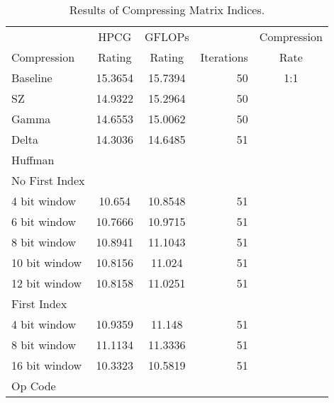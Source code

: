 \begin{table}
	\centering
	\begin{tabular}{l|S[table-format=2.6]|S[table-format=2.6]|r|c}
		            & {HPCG}   & {GFLOPs} &            & Compression \\
		Compression & {Rating} & {Rating} & Iterations & Rate \\
		\hline
		Baseline & 15.3654 & 15.7394 & 50 & 1:1 \\ %
		SZ & 14.9322 & 15.2964 & 50 & \\
		Gamma & 14.6553 & 15.0062 & 50 & \\ %
		Delta & 14.3036 & 14.6485 & 51 & \\
		Huffman & & & & \\
		\hspace{3mm}No First Index & & & & \\
			\hspace{6mm}4 bit window & 10.654 & 10.8548 & 51 & \\
			\hspace{6mm}6 bit window & 10.7666 & 10.9715 & 51 & \\
			\hspace{6mm}8 bit window & 10.8941 & 11.1043 & 51 & \\
			\hspace{6mm}10 bit window & 10.8156 & 11.024 & 51 & \\
			\hspace{6mm}12 bit window & 10.8158 & 11.0251 & 51 & \\
		\hspace{3mm}First Index & & & & \\
			\hspace{6mm}4 bit window & 10.9359 & 11.148 & 51 & \\
			\hspace{6mm}8 bit window & 11.1134 & 11.3336 & 51 & \\
			\hspace{6mm}16 bit window & 10.3323 & 10.5819 & 51 & \\
		Op Code & & & & \\
	\end{tabular}
	\caption{Results of Compressing Matrix Indices.}
	\label{tab:results-ind}
\end{table}
